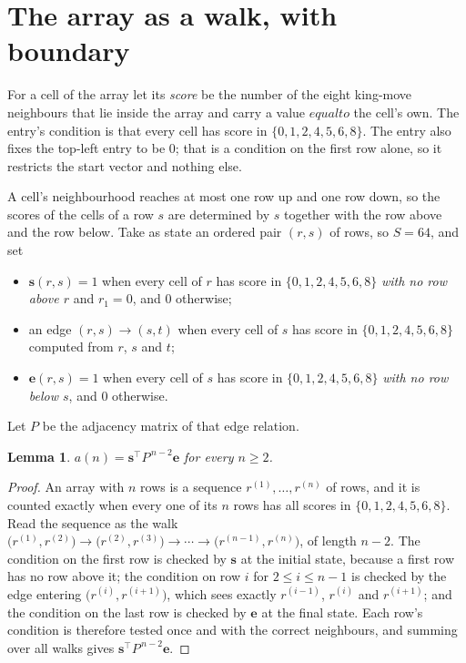 \documentclass[11pt,a4paper]{article}
\theoremstyle{plain}
\newtheorem{lemma}[theorem]{Lemma}
\theoremstyle{definition}
\begin{document}
\section{The array as a walk, with boundary}

For a cell of the array let its \emph{score} be the number of the eight king-move neighbours that lie inside
the array and carry a value $equal to$ the cell's own. The entry's condition is that every cell
has score in $\{0,1,2,4,5,6,8\}$. The entry also fixes the top-left entry to be $0$; that is a condition on the first row alone, so it restricts the start vector and nothing else.

A cell's neighbourhood reaches at most one row up and one row down, so the scores of the
cells of a row $s$ are determined by $s$ together with the row above and the row below.
Take as state an ordered pair $(r,s)$ of rows, so $S=64$, and set
\begin{itemize}
\item $\mathbf{s}(r,s)=1$ when every cell of $r$ has score in $\{0,1,2,4,5,6,8\}$ \emph{with no row
above $r$} and $r_1=0$, and $0$ otherwise;
\item an edge $(r,s)\to(s,t)$ when every cell of $s$ has score in $\{0,1,2,4,5,6,8\}$ computed from
$r$, $s$ and $t$;
\item $\mathbf{e}(r,s)=1$ when every cell of $s$ has score in $\{0,1,2,4,5,6,8\}$ \emph{with no row
below $s$}, and $0$ otherwise.
\end{itemize}
Let $P$ be the adjacency matrix of that edge relation.

\begin{lemma}\label{lem:walk}
$a(n)=\mathbf{s}^{\!\top}P^{\,n-2}\mathbf{e}$ for every $n\ge2$.
\end{lemma}

\begin{proof}
An array with $n$ rows is a sequence $r^{(1)},\dots,r^{(n)}$ of rows, and it is counted
exactly when every one of its $n$ rows has all scores in $\{0,1,2,4,5,6,8\}$. Read the sequence as the
walk $\bigl(r^{(1)},r^{(2)}\bigr)\to\bigl(r^{(2)},r^{(3)}\bigr)\to\cdots\to
\bigl(r^{(n-1)},r^{(n)}\bigr)$, of length $n-2$. The condition on the first row is
checked by $\mathbf{s}$ at the initial state, because a first row has no row above it; the
condition on row $i$ for $2\le i\le n-1$ is checked by the edge entering
$\bigl(r^{(i)},r^{(i+1)}\bigr)$, which sees exactly $r^{(i-1)}$, $r^{(i)}$ and
$r^{(i+1)}$; and the condition on the last row is checked by $\mathbf{e}$ at the final
state. Each row's condition is therefore tested once and with the correct neighbours, and
summing over all walks gives $\mathbf{s}^{\!\top}P^{\,n-2}\mathbf{e}$.
\end{proof}
\end{document}
